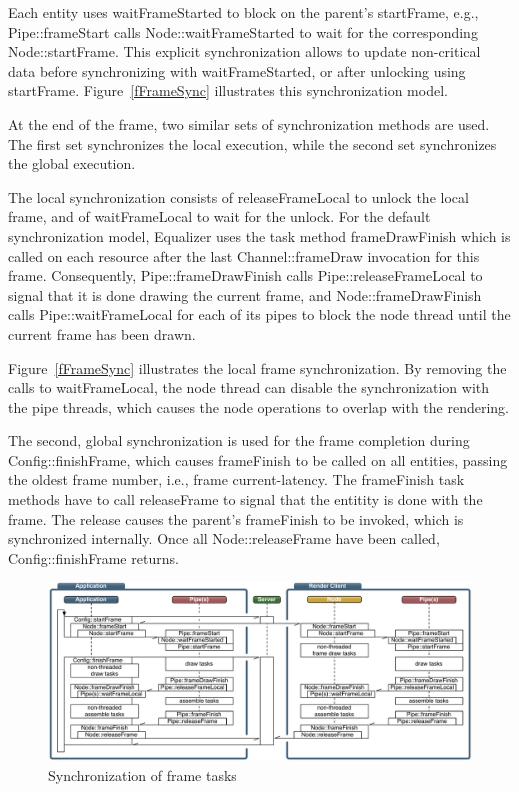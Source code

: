 \documentclass[10pt,a4]{scrartcl}
\newcommand{\fig}[1]{Figure~\ref{#1}}
\begin{document}
Each entity uses \textsf{waitFrameStarted} to block on the parent's
\textsf{startFrame}, e.g., \textsf{Pipe::\-frame\-Start} calls
\textsf{Node::wait\-Frame\-Started} to wait for the corresponding
\textsf{Node::start\-Fra\-me}. This explicit synchronization allows to
update non-critical data before synchronizing with
\textsf{waitFrameStarted}, or after unlocking using
\textsf{start\-Fra\-me}. \fig{fFrameSync} illustrates this
synchronization model.

At the end of the frame, two similar sets of synchronization methods are
used. The first set synchronizes the local execution, while the second
set synchronizes the global execution.

The local synchronization consists of \textsf{releaseFrameLocal} to
unlock the local frame, and of \textsf{waitFrameLocal} to wait for the
unlock. For the default synchronization model, Equalizer uses the task
method \textsf{frameDrawFinish} which is called on each resource
after the last \textsf{Channel::frameDraw} invocation for this
frame. Consequently, \textsf{Pipe::frameDrawFinish} calls
\textsf{Pipe::releaseFrame\-Lo\-cal} to signal that it is done drawing the
current frame, and \textsf{Node::frameDrawFinish} calls
\textsf{Pipe::waitFrameLocal} for each of its pipes to block the node
thread until the current frame has been drawn. 

\fig{fFrameSync} illustrates the local frame synchronization. By
removing the calls to \textsf{waitFrameLocal}, the node thread can
disable the synchronization with the pipe threads, which causes the node
operations to overlap with the rendering.

The second, global synchronization is used for the frame completion
during \textsf{Config::finishFrame}, which causes \textsf{frameFinish}
to be called on all entities, passing the oldest frame number, i.e., frame
\textsf{current-latency}. The \textsf{frameFinish} task methods have to
call \textsf{releaseFrame} to signal that the entitity is done with the
frame. The release causes the parent's \textsf{frameFinish} to be
invoked, which is synchronized internally. Once all
\textsf{Node::releaseFrame} have been called,
\textsf{Config::finishFrame} returns.

\begin{figure}[ht!]\center
  \includegraphics[width=\textwidth]{images/mainloop.pdf}
  {\caption{\small\label{fMainLoop}Synchronization of frame tasks}}
\end{figure}
\end{document}
